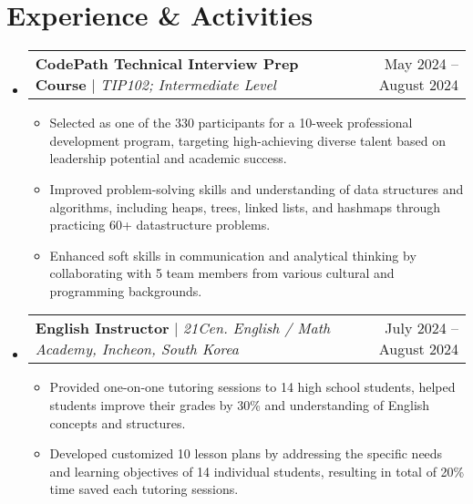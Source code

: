 \documentclass[letterpaper,11pt]{article}
\makeatletter
\newcommand{\resumeItem}[1]{
  \item\small{
    {#1 \vspace{-5pt}}
  }
}
\newcommand{\resumeSubheading}[4]{
  \vspace{-2pt}\item
    \begin{tabular*}{0.97\textwidth}[t]{l@{\extracolsep{\fill}}r@{\hspace{-0.2in}}}
        \textbf{#1} & #2 \\
        \textit{\small#3} & \textit{\small #4} \\
    \end{tabular*}\vspace{-7pt}
}
\newcommand{\resumeProjectHeading}[2]{
    \item
    \begin{tabular*}{0.97\textwidth}{l@{\extracolsep{\fill}}r@{\hspace{-0.2in}}}
        \small#1 & #2 \\
    \end{tabular*}\vspace{-7pt}
}
\newcommand{\resumeSubHeadingListStart}{\begin{itemize}[leftmargin=0.00in, rightmargin=-0.2in, label={}]}
\newcommand{\resumeSubHeadingListEnd}{\end{itemize}}
\newcommand{\resumeItemListStart}{\begin{itemize}[leftmargin=0.15in, rightmargin=0.15in]}
\newcommand{\resumeItemListEnd}{\end{itemize}\vspace{-7pt}}
\makeatother
\begin{document}



\section{Experience \& Activities}
    \vspace{-3pt}
    \resumeSubHeadingListStart
        \resumeProjectHeading
            {\textbf{CodePath Technical Interview Prep Course} $|$ \emph{TIP102; Intermediate Level}}{May 2024 -- August 2024}
            \resumeItemListStart
                \resumeItem{Selected as one of the 330 participants for a 10-week professional development program, targeting high-achieving diverse talent based on leadership potential and academic success.}
                \resumeItem{Improved problem-solving skills and understanding of data structures and algorithms, including heaps, trees, linked lists, and hashmaps through practicing 60+ datastructure problems.}
                \resumeItem{Enhanced soft skills in communication and analytical thinking by collaborating with 5 team members from various cultural and programming backgrounds.}
                \resumeItemListEnd
        \resumeSubHeadingListEnd

    \resumeSubHeadingListStart
        \resumeProjectHeading
            {\textbf{English Instructor} $|$ \emph{21Cen. English / Math Academy, Incheon, South Korea}}{July 2024 -- August 2024}
            \resumeItemListStart
                \resumeItem{Provided one-on-one tutoring sessions to 14 high school students, helped students improve their grades by 30\% and understanding of English concepts and structures.}
                \resumeItem{Developed customized 10 lesson plans by addressing the specific needs and learning objectives of 14 individual students, resulting in total of 20\% time saved each tutoring sessions.}
            \resumeItemListEnd
        \resumeSubHeadingListEnd
\end{document}
